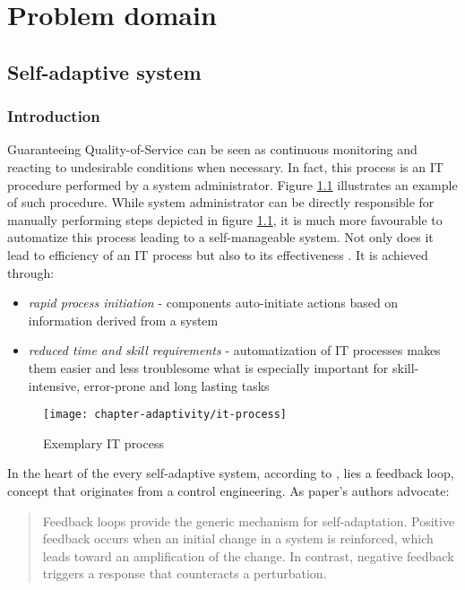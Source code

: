 \chapter{Problem domain}

\section{Self-adaptive system}

\subsection{Introduction}
Guaranteeing Quality-of-Service can be seen as continuous monitoring and reacting to undesirable conditions when necessary. In fact, this process is an IT procedure performed by a system administrator. Figure \ref{fig:it-process} illustrates an example of such procedure. While system administrator can be directly responsible for manually performing steps depicted in figure \ref{fig:it-process}, it is much more favourable to automatize this process leading to a self-manageable system. Not only does it lead to efficiency of an IT process but also to its effectiveness \cite{IBM06}. It is achieved through:
\begin{itemize}
  \item \emph{rapid process initiation} - components auto-initiate actions based on information derived from a system
  \item \emph{reduced time and skill requirements} - automatization of IT processes makes them easier and less troublesome what is especially important for skill-intensive, error-prone and long lasting tasks
\end{itemize}

\begin{figure}[!ht]
  \begin{center}
    \texttt{[image: chapter-adaptivity/it-process]}
  \end{center}
  \caption{Exemplary IT process}
  \label{fig:it-process}
\end{figure}


In the heart of the every self-adaptive system, according to \cite{brun2009engineering}, lies a feedback loop, concept that originates from a control engineering. As paper's authors advocate:
\begin{quote}
Feedback loops provide the generic mechanism for self-adaptation. Positive feedback occurs when an initial change in a system is reinforced, which leads toward an amplification of the change. In contrast, negative feedback triggers a response that counteracts a perturbation. 
\end{quote}

